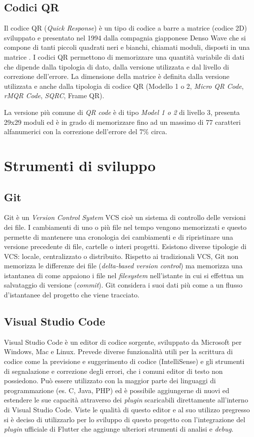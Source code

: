 \subsection{Codici QR}
Il codice QR (\textit{Quick Response}) è un tipo di codice a barre a matrice (codice 2D) sviluppato e presentato nel 1994 dalla compagnia giapponese Denso Wave che si compone di tanti piccoli quadrati neri e bianchi, chiamati moduli, disposti in una matrice \cite{qrCodeDensoWave}.
I codici QR permettono di memorizzare una quantità variabile di dati che dipende dalla tipologia di dato, dalla versione utilizzata e dal livello di correzione dell'errore. La dimensione della matrice è definita dalla versione utilizzata e anche dalla tipologia di codice QR (Modello 1 o 2, \textit{Micro QR Code}, \textit{rMQR Code}, \textit{SQRC}, Frame QR).

La versione più comune di \textit{QR code} è di tipo \textit{Model 1 o 2} di livello 3, presenta 29x29 moduli ed è in grado di memorizzare fino ad un massimo di 77 caratteri alfanumerici con la correzione dell'errore del 7\% circa.

\section{Strumenti di sviluppo}
\subsection{Git}
Git \cite{gitSite} è un \textit{Version Control System} VCS cioè un sistema di controllo delle versioni dei file. I cambiamenti di uno o più file nel tempo vengono memorizzati e questo permette di mantenere una cronologia dei cambiamenti e di ripristinare una versione precedente di file, cartelle o interi progetti. Esistono diverse tipologie di VCS: locale, centralizzato o distribuito.
Rispetto ai tradizionali VCS, Git non memorizza le differenze dei file (\textit{delta-based version control}) ma memorizza una istantanea di come appaiono i file nel \textit{filesystem} nell'istante in cui si effettua un salvataggio di versione (\textit{commit}). Git considera i suoi dati più come a un flusso d'istantanee del progetto che viene tracciato.

\subsection{Visual Studio Code}
Visual Studio Code \cite{vsCodeSite} è un editor di codice sorgente, sviluppato da Microsoft per Windows, Mac e Linux. Prevede diverse funzionalità utili per la scrittura di codice come la previsione e suggerimento di codice (IntelliSense) e gli strumenti di segnalazione e correzione degli errori, che i comuni editor di testo non possiedono.
Può essere utilizzato con la maggior parte dei linguaggi di programmazione (es. C, Java, PHP) ed è possibile aggiungerne di nuovi ed estendere le sue capacità attraverso dei \textit{plugin} scaricabili direttamente all'interno di Visual Studio Code.
Viste le qualità di questo editor e al suo utilizzo pregresso si è deciso di utilizzarlo per lo sviluppo di questo progetto con l'integrazione del \textit{plugin} ufficiale di Flutter che aggiunge ulteriori strumenti di analisi e \textit{debug}.